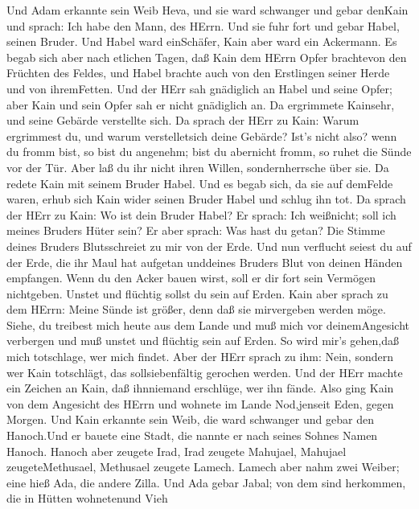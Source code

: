  Und Adam erkannte sein Weib Heva, und sie ward schwanger
und gebar denKain und sprach: Ich habe den Mann, des HErrn. 
Und sie fuhr fort und gebar Habel, seinen Bruder. Und Habel ward
einSchäfer, Kain aber ward ein Ackermann.  Es begab sich
aber nach etlichen Tagen, daß Kain dem HErrn Opfer brachtevon den
Früchten des Feldes,  und Habel brachte auch von den
Erstlingen seiner Herde und von ihremFetten. Und der HErr sah gnädiglich
an Habel und seine Opfer;  aber Kain und sein Opfer sah er
nicht gnädiglich an. Da ergrimmete Kainsehr, und seine Gebärde
verstellte sich.  Da sprach der HErr zu Kain: Warum
ergrimmest du, und warum verstelletsich deine Gebärde? 
Ist's nicht also? wenn du fromm bist, so bist du angenehm; bist du
abernicht fromm, so ruhet die Sünde vor der Tür. Aber laß du ihr nicht
ihren Willen, sondernherrsche über sie.  Da redete Kain mit
seinem Bruder Habel. Und es begab sich, da sie auf demFelde waren, erhub
sich Kain wider seinen Bruder Habel und schlug ihn tot.  Da
sprach der HErr zu Kain: Wo ist dein Bruder Habel? Er sprach: Ich
weißnicht; soll ich meines Bruders Hüter sein?  Er aber
sprach: Was hast du getan? Die Stimme deines Bruders Blutsschreiet zu
mir von der Erde.  Und nun verflucht seiest du auf der
Erde, die ihr Maul hat aufgetan unddeines Bruders Blut von deinen Händen
empfangen.  Wenn du den Acker bauen wirst, soll er dir fort
sein Vermögen nichtgeben. Unstet und flüchtig sollst du sein auf Erden.
 Kain aber sprach zu dem HErrn: Meine Sünde ist größer,
denn daß sie mirvergeben werden möge.  Siehe, du treibest
mich heute aus dem Lande und muß mich vor deinemAngesicht verbergen und
muß unstet und flüchtig sein auf Erden. So wird mir's gehen,daß mich
totschlage, wer mich findet.  Aber der HErr sprach zu ihm:
Nein, sondern wer Kain totschlägt, das sollsiebenfältig gerochen werden.
Und der HErr machte ein Zeichen an Kain, daß ihnniemand erschlüge, wer
ihn fände.  Also ging Kain von dem Angesicht des HErrn und
wohnete im Lande Nod,jenseit Eden, gegen Morgen.  Und Kain
erkannte sein Weib, die ward schwanger und gebar den Hanoch.Und er
bauete eine Stadt, die nannte er nach seines Sohnes Namen Hanoch.
 Hanoch aber zeugete Irad, Irad zeugete Mahujael, Mahujael
zeugeteMethusael, Methusael zeugete Lamech.  Lamech aber
nahm zwei Weiber; eine hieß Ada, die andere Zilla.  Und Ada
gebar Jabal; von dem sind herkommen, die in Hütten wohnetenund Vieh
